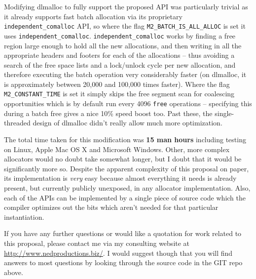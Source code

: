 \documentclass[wd]{isov2}
\begin{document}
{Modifying dlmalloc to fully support the proposed API was particularly trivial as it already supports fast batch allocation via its proprietary \texttt{independent\_comalloc} API, so where the flag \texttt{M2\_BATCH\_IS\_ALL\_ALLOC} is set it uses \texttt{independent\_comalloc}. \texttt{independent\_comalloc} works by finding a free region large enough to hold all the new allocations, and then writing in all the appropriate headers and footers for each of the allocations -- thus avoiding a search of the free space lists and a lock/unlock cycle per new allocation, and therefore executing the batch operation very considerably faster (on dlmalloc, it is approximately between 20,000 and 100,000 times faster). Where the flag \texttt{M2\_CONSTANT\_TIME} is set it simply skips the free segment scan for coalescing opportunities which is by default run every 4096 \texttt{free} operations -- specifying this during a batch free gives a nice 10\% speed boost too. Past these, the single-threaded design of dlmalloc didn't really allow much more optimization.

The total time taken for this modification was \textbf{15 man hours} including testing on Linux, Apple Mac OS X and Microsoft Windows. Other, more complex allocators would no doubt take somewhat longer, but I doubt that it would be significantly more so. Despite the apparent complexity of this proposal on paper, its implementation is \emph{very} easy because almost everything it needs is already present, but currently publicly unexposed, in any allocator implementation. Also, each of the APIs can be implemented by a single piece of source code which the compiler optimizes out the bits which aren't needed for that particular instantiation.

If you have any further questions or would like a quotation for work related to this proposal, please contact me via my consulting website at \url{http://www.nedproductions.biz/}. I would suggest though that you will find answers to most questions by looking through the source code in the GIT repo above.

\bibannex
\begin{nreferences}

\end{nreferences}

}
\end{document}
